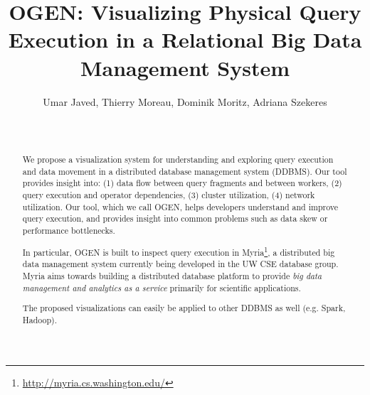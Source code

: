 \documentclass{chi2009}
\newcommand*{\system}{OGEN\xspace}
\newcommand*{\papertitle}{\system: Visualizing Physical Query Execution in a Relational Big Data Management System}
\begin{document}
\setlength{\paperheight}{11in}
\setlength{\paperwidth}{8.5in}
\setlength{\pdfpageheight}{\paperheight}
\setlength{\pdfpagewidth}{\paperwidth}

\toappear{}

\title{\papertitle}
\author{\alignauthor Umar Javed, Thierry Moreau, Dominik Moritz, Adriana Szekeres \\
 \\  \\
}

\maketitle

\begin{abstract}

We propose a visualization system for understanding and exploring query execution and data movement in a distributed database management system (DDBMS). Our tool provides insight into: (1) data flow between query fragments and between workers, (2) query execution and operator dependencies, (3) cluster utilization, (4) network utilization. Our tool, which we call \system, helps developers understand and improve query execution, and provides insight into common problems such as data skew or performance bottlenecks.

In particular, \system is built to inspect query execution in Myria\footnote{\url{http://myria.cs.washington.edu/}}, a distributed big data management system currently being developed in the UW CSE database group. Myria aims towards building a distributed database platform to provide \emph{big data management and analytics as a service} primarily for scientific applications.

The proposed visualizations can easily be applied to other DDBMS as well (e.g. Spark, Hadoop).

\end{abstract}


\end{document}
